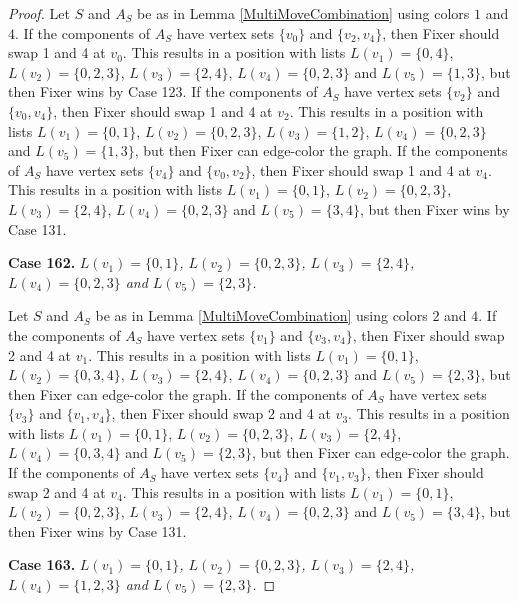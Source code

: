 \documentclass[12pt]{amsart}
\theoremstyle{plain}
\theoremstyle{definition}
\theoremstyle{remark}
\begin{document}
\begin{proof}
Let $S$ and $A_S$ be as in Lemma \ref{MultiMoveCombination} using colors $1$ and $4$. If the components of $A_S$ have vertex sets $\{v_0\}$ and $\{v_2, v_4\}$, then Fixer should swap 1 and 4 at $v_0$. This results in a position with lists $L(v_1) = \{0, 4\}$, $L(v_2) = \{0, 2, 3\}$, $L(v_3) = \{2, 4\}$, $L(v_4) = \{0, 2, 3\}$ and $L(v_5) = \{1, 3\}$, but then Fixer wins by Case 123.
If the components of $A_S$ have vertex sets $\{v_2\}$ and $\{v_0, v_4\}$, then Fixer should swap 1 and 4 at $v_2$. This results in a position with lists $L(v_1) = \{0, 1\}$, $L(v_2) = \{0, 2, 3\}$, $L(v_3) = \{1, 2\}$, $L(v_4) = \{0, 2, 3\}$ and $L(v_5) = \{1, 3\}$, but then Fixer can edge-color the graph.
If the components of $A_S$ have vertex sets $\{v_4\}$ and $\{v_0, v_2\}$, then Fixer should swap 1 and 4 at $v_4$. This results in a position with lists $L(v_1) = \{0, 1\}$, $L(v_2) = \{0, 2, 3\}$, $L(v_3) = \{2, 4\}$, $L(v_4) = \{0, 2, 3\}$ and $L(v_5) = \{3, 4\}$, but then Fixer wins by Case 131.

\noindent\textbf{Case 162.  }\textit{$L(v_1) = \{0, 1\}$, $L(v_2) = \{0, 2, 3\}$, $L(v_3) = \{2, 4\}$, $L(v_4) = \{0, 2, 3\}$ and $L(v_5) = \{2, 3\}$.}

Let $S$ and $A_S$ be as in Lemma \ref{MultiMoveCombination} using colors $2$ and $4$. If the components of $A_S$ have vertex sets $\{v_1\}$ and $\{v_3, v_4\}$, then Fixer should swap 2 and 4 at $v_1$. This results in a position with lists $L(v_1) = \{0, 1\}$, $L(v_2) = \{0, 3, 4\}$, $L(v_3) = \{2, 4\}$, $L(v_4) = \{0, 2, 3\}$ and $L(v_5) = \{2, 3\}$, but then Fixer can edge-color the graph.
If the components of $A_S$ have vertex sets $\{v_3\}$ and $\{v_1, v_4\}$, then Fixer should swap 2 and 4 at $v_3$. This results in a position with lists $L(v_1) = \{0, 1\}$, $L(v_2) = \{0, 2, 3\}$, $L(v_3) = \{2, 4\}$, $L(v_4) = \{0, 3, 4\}$ and $L(v_5) = \{2, 3\}$, but then Fixer can edge-color the graph.
If the components of $A_S$ have vertex sets $\{v_4\}$ and $\{v_1, v_3\}$, then Fixer should swap 2 and 4 at $v_4$. This results in a position with lists $L(v_1) = \{0, 1\}$, $L(v_2) = \{0, 2, 3\}$, $L(v_3) = \{2, 4\}$, $L(v_4) = \{0, 2, 3\}$ and $L(v_5) = \{3, 4\}$, but then Fixer wins by Case 131.

\noindent\textbf{Case 163.  }\textit{$L(v_1) = \{0, 1\}$, $L(v_2) = \{0, 2, 3\}$, $L(v_3) = \{2, 4\}$, $L(v_4) = \{1, 2, 3\}$ and $L(v_5) = \{2, 3\}$.}


\end{proof}
\end{document}
